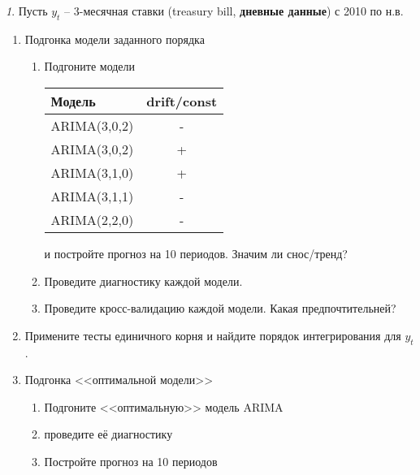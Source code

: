 \documentclass[12pt]{article}
\theoremstyle{remark}
\newtheorem{exercise}{}[subsection]
\begin{document}
\begin{exercise}
Пусть \(y_t\) -- 3-месячная ставки (treasury bill, \textbf{дневные данные}) с 2010 по н.в.
\begin{enumerate}
	\item Подгонка модели заданного порядка
	\begin{enumerate}
		\item Подгоните модели
		\begin{center}
		\begin{tabular}{l|c}
			Модель & drift/const \\ \hline
			ARIMA(3,0,2) & - \\
			ARIMA(3,0,2) & + \\
			ARIMA(3,1,0) & + \\
			ARIMA(3,1,1) & - \\
			ARIMA(2,2,0) & - \\ \hline
		\end{tabular}
		\end{center} 
		и постройте прогноз на 10 периодов. Значим ли снос/тренд?
		\item Проведите диагностику каждой модели.
		\item Проведите кросс-валидацию каждой модели. Какая предпочтительней?
	\end{enumerate}
	\item Примените тесты единичного корня и найдите порядок интегрирования для \(y_t\). 
	\item Подгонка <<оптимальной модели>>
	\begin{enumerate}
		\item Подгоните <<оптимальную>> модель ARIMA
		\item проведите её диагностику
		\item Постройте прогноз на 10 периодов
	\end{enumerate}
\end{enumerate}
\end{exercise}


\end{document}

